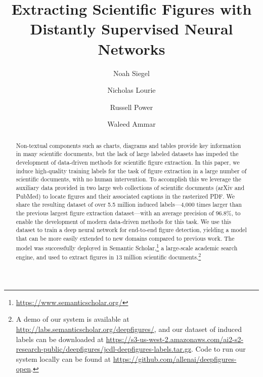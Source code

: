 \documentclass[sigconf]{acmart}
\begin{document}
\title{Extracting Scientific Figures with\\Distantly Supervised Neural Networks}


\author{Noah Siegel}

\author{Nicholas Lourie}

\author{Russell Power}

\author{Waleed Ammar}


\begin{abstract}

Non-textual components such as charts, diagrams and tables provide key information in many scientific documents, but the lack of large labeled datasets has impeded the development of data-driven methods for scientific figure extraction.
In this paper, we induce high-quality training labels for the task of figure extraction in a large number of scientific documents, with no human intervention. 
To accomplish this we leverage the auxiliary data provided in two large web collections of scientific documents (arXiv and PubMed) to locate figures and their associated captions in the rasterized PDF.
We share the resulting dataset of over 5.5 million induced labels---4,000 times larger than the previous largest figure extraction dataset---with an average precision of 96.8\%, to enable the development of modern data-driven methods for this task.
We use this dataset to train a deep neural network for end-to-end figure detection, yielding a model that can be more easily extended to new domains compared to previous work.
The model was successfully deployed in {Semantic Scholar},\footnote{\url{https://www.semanticscholar.org/}} a large-scale academic search engine, and used to extract figures in 13 million scientific documents.\footnote{A demo of our system is available at \url{http://labs.semanticscholar.org/deepfigures/}, and our dataset of induced labels can be downloaded at \url{https://s3-us-west-2.amazonaws.com/ai2-s2-research-public/deepfigures/jcdl-deepfigures-labels.tar.gz}. Code to run our system locally can be found at \url{https://github.com/allenai/deepfigures-open}.}

\end{abstract}
\end{document}
